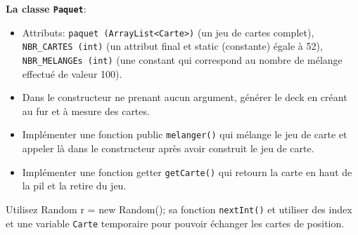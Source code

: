 \begin{Exercice}[15 minutes]
\textbf{La classe \lstinline{Paquet}}:
\begin{itemize}
    \item Attributs: \lstinline{paquet (ArrayList<Carte>)} (un jeu de cartes complet), \lstinline{NBR_CARTES (int)} (un attribut final et static (constante) égale à 52), \lstinline{NBR_MELANGEs (int)} (une constant qui correspond au nombre de mélange effectué de valeur 100).
    \item Dans le constructeur ne prenant aucun argument, générer le deck en créant au fur et à mesure des cartes. 
    \item Implémenter une fonction public \lstinline{melanger()} qui mélange le jeu de carte et appeler là dans le constructeur après avoir construit le jeu de carte.
    \item Implémenter une fonction getter \lstinline{getCarte()} qui retourn la carte en haut de la pil et la retire du jeu.
\end{itemize}
\begin{conseil}
Utilisez Random r = new Random(); sa fonction \lstinline{nextInt()} et utiliser des index et une variable \lstinline{Carte} temporaire pour pouvoir échanger les cartes de position.
\end{conseil}




\begin{solution}

\end{solution}
\begin{solution}

\end{solution}
\begin{solution}

\end{solution}
\end{Exercice}

